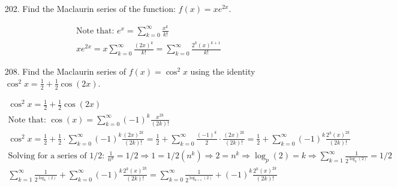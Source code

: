 \begin{itemize}
        \item [202.] Find the Maclaurin series of the function: $f(x) = xe^{2x}$.
        \\
        \begin{mdframed}
            \begin{equation*}
                \begin{gathered}
                    \text{Note that: } e^{x} = 
                    \sum_{k=0}^{\infty}\frac{x^{k}}{k!}                 \\
                    xe^{2x} = x\sum_{k=0}^{\infty}\frac{(2x)^{k}}{k!} =
                    \boxed{\sum_{k=0}^{\infty}\frac{2^{k}(x)^{k+1}}{k!}}
                \end{gathered}
            \end{equation*}
        \end{mdframed}
        
        \item [208.] Find the Maclaurin series of $f(x)=\cos^{2}x$ using the identity $\cos^{2}x=\frac{1}{2}+\frac{1}{2}\cos(2x)$.
        \\
        \begin{mdframed}
            \begin{equation*}
                \begin{gathered}
                    \cos^{2}x=\frac{1}{2}+\frac{1}{2}\cos(2x)           \\
                    \text{Note that: } \cos(x)
                     = \sum_{k=0}^{\infty}(-1)^{k}\frac{x^{2k}}{(2k)!}  \\
                    \cos^{2}x = \frac{1}{2} + \frac{1}{2} \cdot
                    \sum_{k=0}^{\infty}(-1)^{k}\frac{(2x)^{2k}}{(2k)!} =
                    \frac{1}{2} + \sum_{k=0}^{\infty}
                    \frac{(-1)^{k}}{2} \cdot \frac{(2x)^{2k}}{(2k)!} =
                    \frac{1}{2} + \sum_{k=0}^{\infty}
                    (-1)^{k} \frac{2^{k}(x)^{2k}}{(2k)!}                \\
                    \text{Solving for a series of 1/2: } 
                    \frac{1}{n^{k}} = 1/2                               \Rightarrow
                    1 = 1/2(n^{k})                                      \Rightarrow
                    2 = n^{k}                                           \Rightarrow
                    \log_{p}(2) = k                                     \Rightarrow
                    \sum_{k=1}^{\infty}\frac{1}{2^{\log_{k}(2)}} = 1/2  \\
                    \sum_{k=1}^{\infty}\frac{1}{2^{\log_{k}(2)}} + \sum_{k=0}^{\infty}
                    (-1)^{k} \frac{2^{k}(x)^{2k}}{(2k)!} =              
                    \boxed{\sum_{k=0}^{\infty}\frac{1}{2^{\log_{k+1}(2)}} +
                    (-1)^{k} \frac{2^{k}(x)^{2k}}{(2k)!}}
                \end{gathered}
            \end{equation*}
        \end{mdframed}
    \end{itemize}

